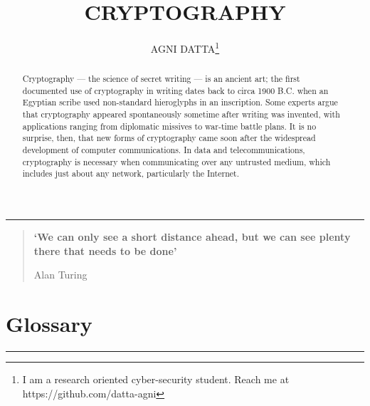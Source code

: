 \documentclass[british]{article}
\begin{document}
\title{\textbf{\Huge{}CRYPTOGRAPHY}}
\author{AGNI DATTA\thanks{I am a research oriented cyber-security student. Reach me at https://github.com/datta-agni}}
\maketitle
\begin{center}
	\rule[0.5ex]{0.5\columnwidth}{0.75pt}
	\par\end{center}
\begin{quotation}
	\begin{center}
		\textbf{`We can only see a short distance ahead, but we can see plenty
			there that needs to be done'}
		\par\end{center}
	\begin{center}
		Alan Turing
		\par\end{center}

\end{quotation}
\medskip{}

\begin{abstract}
	{\normalsize{}Cryptography --- the science of secret writing ---
		is an ancient art; the first documented use of cryptography in writing
		dates back to circa 1900 B.C. when an Egyptian scribe used non-standard
		hieroglyphs in an inscription. Some experts argue that cryptography
		appeared spontaneously sometime after writing was invented, with applications
		ranging from diplomatic missives to war-time battle plans. It is no
		surprise, then, that new forms of cryptography came soon after the
		widespread development of computer communications. In data and telecommunications,
		cryptography is necessary when communicating over any untrusted medium,
		which includes just about any network, particularly the Internet.}{\normalsize\par}

	\vfill{}
\end{abstract}
\pagebreak{}

\tableofcontents{}

\vfill{}

\pagebreak{}

\section{Glossary}
\begin{center}
	\rule[0.5ex]{450bp}{0.75pt}
	\par\end{center}
\end{document}
